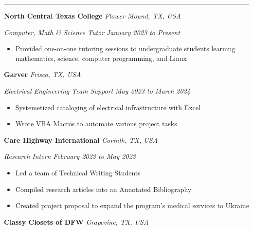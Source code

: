 \documentclass[10pt, a4paper]{article}
\newcommand{\rangesep}{to\xspace}  %
\renewcommand{\date}[1]{\textit{#1}}
\newcommand{\location}[1]{\textit{#1}}
\newcommand{\heading}[1]{
    \makebox[0pt][l]{\Large \sc \hspace{2pt}#1}
    \rule[-0.7ex]{\columnwidth}{0.5pt}\vspace{1.0ex}
}
\newcommand{\subheading}[1]{{\bfseries #1}}
\newcommand{\subheadSkip}{\vspace{0.7ex}}
\newenvironment{mysection}[1]
{\vspace{2.5ex}
\heading{#1}
\begin{adjustwidth}{0.3cm}{0cm}}
{\end{adjustwidth} }
\begin{document}
    \begin{mysection}{Employment}
         \subheading{North Central Texas College} \hfill \location{Flower Mound, TX, USA}

        \vspace{0.1ex}
        \textit{Computer, Math \& Science Tutor} \hfill \date{January 2023 \rangesep Present}
        \begin{itemize}
            \item Provided one-on-one tutoring sessions to undergraduate students learning mathematics, science, computer programming, and Linux
        \end{itemize}
        \subheadSkip
        \subheading{Garver} \hfill \location{Frisco, TX, USA}

        \textit{Electrical Engineering Team Support} \hfill \date{May 2023 \rangesep March 2024}
        \vspace{0.1ex}
        \begin{itemize}
            \item Systemetized cataloging of electrical infrastructure with Excel
            \item Wrote VBA Macros to automate various project tasks
        \end{itemize}
        \subheadSkip
        \subheading{Care Highway International} \hfill \location{Corinth, TX, USA}

        \textit{Research Intern} \hfill \date{February 2023 \rangesep May 2023}
        \vspace{0.1ex}
        \begin{itemize}
            \item Led a team of Technical Writing Students
            \item Compiled research articles into an Annotated Bibliography
            \item Created project proposal to expand the program's medical services to Ukraine
        \end{itemize}
        \subheadSkip
       \subheading{Classy Closets of DFW} \hfill \location{Grapevine, TX, USA}


\end{mysection}
\end{document}

